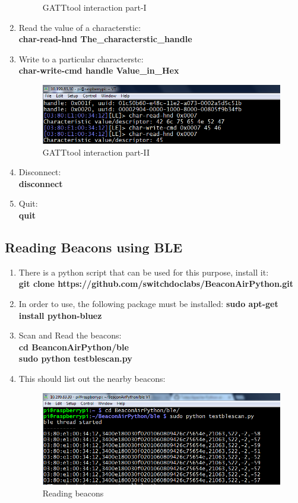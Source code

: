 \begin{enumerate}
\begin{figure}[ht]
				\caption{GATTtool interaction part-I}
			\end{figure}
		\item Read the value of a characterstic:\\
       			\textbf{char-read-hnd The\_characterstic\_handle}
   			\item Write to a particular characterstc:\\
       			\textbf{char-write-cmd handle Value\_in\_Hex}
				\begin{figure}[ht]
				\centering
				\includegraphics[scale=0.5]{images/gatttool2.png}
				\caption{GATTtool interaction part-II}
			\end{figure}
   			\item Disconnect:\\
       			\textbf{disconnect}
   			\item Quit:\\
       			\textbf{quit}
	\end{enumerate}
\subsection{Reading Beacons using BLE}
	\begin{enumerate}
		\item There is a python script that can be used for this purpose, install it:\\
			\textbf{git clone https://github.com/switchdoclabs/BeaconAirPython.git}
		\item In order to use, the following package must be installed:
			\textbf{sudo apt-get install python-bluez}
		\item Scan and Read the beacons:\\
			\textbf{cd BeanconAirPython/ble}\\
			\textbf{sudo python testblescan.py}
		\item This should list out the nearby beacons:
			\begin{figure}[ht]
				\centering
				\includegraphics[scale=0.5]{images/beacon_read.png}
				\caption{Reading beacons}
			\end{figure}
	\end{enumerate}
